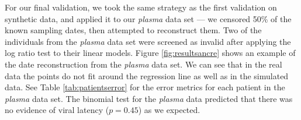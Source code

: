 \documentclass[12pt]{article}
\begin{document}
For our final validation, we took the same strategy as the first validation on synthetic data, and applied it to our {\em plasma} data set --- we censored 50\% of the known sampling dates, then attempted to reconstruct them.
Two of the individuals from the {\em plasma} data set were screened as invalid after applying the log ratio test to their linear models.
Figure \ref{fig:resultsancre} shows an example of the date reconstruction from the \emph{plasma} data set.
We can see that in the real data the points do not fit around the regression line as well as in the simulated data.
See Table \ref{tab:patientserror} for the error metrics for each patient in the \emph{plasma} data set.
The binomial test for the \emph{plasma} data predicted that there was no evidence of viral latency ($p=0.45$) as we expected.
\end{document}
